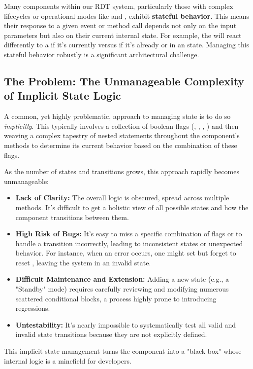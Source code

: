 Many components within our RDT system, particularly those with complex lifecycles or operational modes like  and , exhibit \textbf{stateful behavior}. This means their response to a given event or method call depends not only on the input parameters but also on their current internal state. For example, the  will react differently to a  if it's currently  versus if it's already  or in an  state. Managing this stateful behavior robustly is a significant architectural challenge.

\subsection{The Problem: The Unmanageable Complexity of Implicit State Logic}
\label{subsec:implicit_state_problem_conceptual_revised}

A common, yet highly problematic, approach to managing state is to do so \textit{implicitly}. This typically involves a collection of boolean flags (, , , ) and then weaving a complex tapestry of nested  statements throughout the component's methods to determine its current behavior based on the combination of these flags.

As the number of states and transitions grows, this approach rapidly becomes unmanageable:
\begin{itemize}
    \item \textbf{Lack of Clarity:} The overall logic is obscured, spread across multiple methods. It's difficult to get a holistic view of all possible states and how the component transitions between them.
    \item \textbf{High Risk of Bugs:} It's easy to miss a specific combination of flags or to handle a transition incorrectly, leading to inconsistent states or unexpected behavior. For instance, when an error occurs, one might set  but forget to reset , leaving the system in an invalid state.
    \item \textbf{Difficult Maintenance and Extension:} Adding a new state (e.g., a "Standby" mode) requires carefully reviewing and modifying numerous scattered conditional blocks, a process highly prone to introducing regressions.
    \item \textbf{Untestability:} It's nearly impossible to systematically test all valid and invalid state transitions because they are not explicitly defined.
\end{itemize}
This implicit state management turns the component into a "black box" whose internal logic is a minefield for developers.

